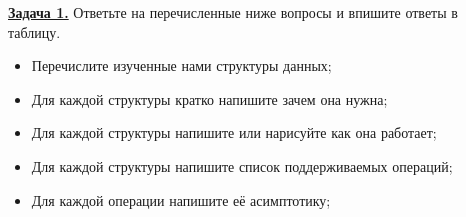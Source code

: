 \def\taskname#1{\underline{\textbf{Задача #1.}}}
\def\taskArow{ & & \\[21 mm] \hline}
\def\taskBrow#1{#1 & & \\[25mm] \hline}
\def\taskCrow{ & \\[15mm] \hline}
\def\tablehead#1{\textbf{#1}}


\taskname{1} Ответьте на перечисленные ниже вопросы и впишите ответы в таблицу.

\begin{itemize}
    \item Перечислите изученные нами структуры данных;
    \item Для каждой структуры кратко напишите зачем она нужна;
    \item Для каждой структуры напишите или нарисуйте как она работает;
    \item Для каждой структуры напишите список поддерживаемых операций;
    \item Для каждой операции напишите её асимптотику;
\end{itemize}

